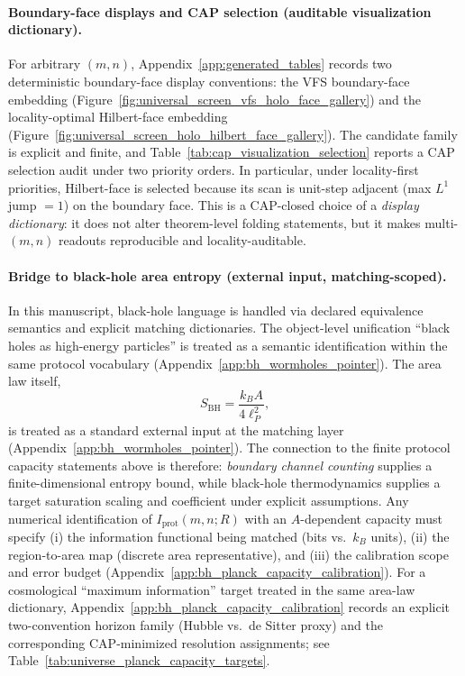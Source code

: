 \paragraph{Boundary-face displays and CAP selection (auditable visualization dictionary).}
\InterfaceTag For arbitrary $(m,n)$, Appendix~\ref{app:generated_tables} records two deterministic boundary-face display conventions:
the VFS boundary-face embedding (Figure~\ref{fig:universal_screen_vfs_holo_face_gallery}) and the locality-optimal Hilbert-face embedding (Figure~\ref{fig:universal_screen_holo_hilbert_face_gallery}).
The candidate family is explicit and finite, and Table~\ref{tab:cap_visualization_selection} reports a CAP selection audit under two priority orders.
In particular, under locality-first priorities, Hilbert-face is selected because its scan is unit-step adjacent (max $L^1$ jump $=1$) on the boundary face.
This is a CAP-closed choice of a \emph{display dictionary}: it does not alter theorem-level folding statements, but it makes multi-$(m,n)$ readouts reproducible and locality-auditable.

\paragraph{Bridge to black-hole area entropy (external input, matching-scoped).}
\MatchTag In this manuscript, black-hole language is handled via declared equivalence semantics and explicit matching dictionaries.
The object-level unification ``black holes as high-energy particles'' is treated as a semantic identification within the same protocol vocabulary (Appendix~\ref{app:bh_wormholes_pointer}).
The area law itself,
\[
S_{\mathrm{BH}}=\frac{k_BA}{4\ell_P^2},
\]
is treated as a standard external input at the matching layer (Appendix~\ref{app:bh_wormholes_pointer}).
\AuditTag The connection to the finite protocol capacity statements above is therefore:
\emph{boundary channel counting} supplies a finite-dimensional entropy bound, while black-hole thermodynamics supplies a target saturation scaling and coefficient under explicit assumptions.
Any numerical identification of $I_{\mathrm{prot}}(m,n;R)$ with an $A$-dependent capacity must specify (i) the information functional being matched (bits vs.\ $k_B$ units), (ii) the region-to-area map (discrete area representative), and (iii) the calibration scope and error budget (Appendix~\ref{app:bh_planck_capacity_calibration}).
\MatchTag For a cosmological ``maximum information'' target treated in the same area-law dictionary, Appendix~\ref{app:bh_planck_capacity_calibration} records an explicit two-convention horizon family (Hubble vs.\ de Sitter proxy) and the corresponding CAP-minimized resolution assignments; see Table~\ref{tab:universe_planck_capacity_targets}.

